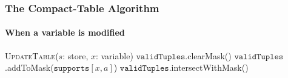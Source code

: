 \documentclass{beamer}
\newcommand{\Dom}[1]{\text{dom}({#1})}
\newcommand{\CurrTable}{\texttt{validTuples}}
\newcommand{\Supports}{\texttt{supports}}
\newcommand{\FOREACH}[1]{\FORALL{{#1} \textbf{do}}}
\newcommand{\ENDFOREACH}{\ENDFOR}
\def\PROCEDURE{\item[\textbf{PROCEDURE}]}
\def\UpdateTable{\textsc{UpdateTable}}
\begin{document}

\begin{frame}
  \frametitle{The Compact-Table Algorithm}
  \framesubtitle{When a variable is modified}
  \begin{algorithm}[H]
    \small
    \begin{algorithmic}[1]
        \PROCEDURE \UpdateTable($s$: store, $x$: variable) \label{line:updateTableDelta:1} 
        \STATE $\CurrTable$.clearMask() \label{line:updateTableDelta:4} 
          \FOREACH{value $a \in s(x)$} \label{line:updateTableDelta:8} 
            \STATE $\CurrTable$.addToMask($\Supports[x,a]$) \label{line:updateTableDelta:9} 
          \ENDFOREACH      
        \STATE $\CurrTable$.intersectWithMask() \label{line:updateTable:10} 
    \end{algorithmic}
  \end{algorithm}
\end{frame}
\end{document}
